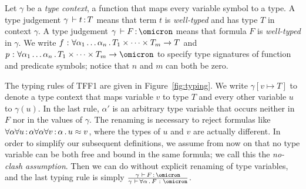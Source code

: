 Let $\gamma$ be a {\em type context}, a function that maps
every variable symbol to a type.
A type judgement $\gamma \,\vdash t \operatorname{:} T$ means that term $t$
is {\em well-typed\/} and has type $T$ in context $\gamma$.
A type judgement $\gamma \,\vdash F \ty \omicron$ means that formula $F$
is {\em well-typed\/} in $\gamma$.
We write $f \,\operatorname{:}\, \forall \alpha_1\dots\alpha_n \,.\,
T_1 \times \dots \times T_m \to T$ and
$p \,\ty\, \forall \alpha_1\dots\alpha_n \,.\,
T_1 \times \dots \times T_m \to \omicron$ to specify
type signatures of function and predicate symbols;
notice that $n$ and $m$ can both be zero.

The typing rules of TFF1 are given in Figure~\ref{fig:typing}.
We write $\gamma[v \mapsto T]$ to denote a type context that maps
variable $v$ to type $T$ and every other variable $u$ to $\gamma(u)$.
In the last rule, $\alpha'$ is an arbitrary type variable that
occurs neither in $F$ nor in the values of $\gamma$.
The renaming is necessary to reject formulas like
$\forall\alpha\forall u\operatorname{:}\alpha\forall\alpha\forall v\operatorname{:}\alpha \,.\,
u \approx v$, where the types of $u$ and $v$ are actually different.
In order to simplify our subsequent definitions, we assume from now on
that no type variable can be both free and bound in the same formula;
we call this the {\em no-clash assumption}.
Then we can do without explicit renaming of type variables,
and the last typing rule is simply
$\frac{\gamma\, \,\vdash\, F \ty \omicron}{
\gamma\, \,\vdash\, \forall \alpha \,.\, F \,\ty\, \omicron}$.

